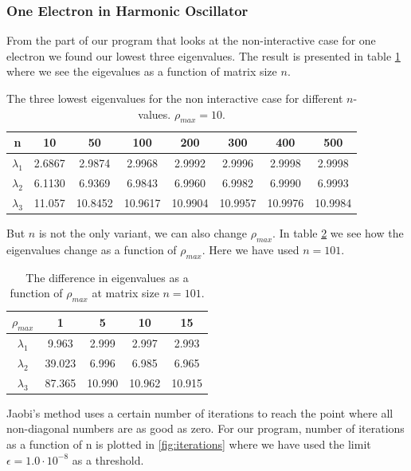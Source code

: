 \documentclass{article}
\begin{document}
\subsubsection{One Electron in Harmonic Oscillator}
From the part of our program that looks at the non-interactive case for one electron we found our lowest three eigenvalues. The result is presented in table \ref{tab:eigenvalues} where we see the eigevalues as a function of matrix size $n$.
\begin{table}[H]
\centering
\caption{The three lowest eigenvalues for the non interactive case for different $n$-values. $\rho_{max} = 10.$}
\begin{tabular}{c|c|c|c|c|c|c|c} 
n & 10 & 50 & 100 & 200 & 300 & 400 & 500 \\ \hline
$\lambda_1$ & 2.6867 & 2.9874  & 2.9968  & 2.9992  & 2.9996 & 2.9998  & 2.9998 \\ \hline
$\lambda_2$ & 6.1130 & 6.9369  & 6.9843  & 6.9960  & 6.9982 & 6.9990  & 6.9993\\ \hline
$\lambda_3$ & 11.057 & 10.8452 & 10.9617 & 10.9904 & 10.9957& 10.9976 & 10.9984\\ 
\end{tabular}
\label{tab:eigenvalues}
\end{table}
But $n$ is not the only variant, we can also change $\rho_{max}$. In table \ref{tab:rhoeigenvalues} we see how the eigenvalues change as a function of $\rho_{max}$. Here we have used $n = 101$.
\begin{table}[H]
\centering
\caption{The difference in eigenvalues as a function of $\rho_{max}$ at matrix size $n = 101$.}
\begin{tabular}{c|c|c|c|c}
$\rho_{max}$ & 1 & 5 & 10 & 15 \\ \hline
$\lambda_1$ &  9.963  & 2.999  & 2.997  & 2.993 \\ \hline
$\lambda_2$ &  39.023 & 6.996  & 6.985  & 6.965 \\ \hline
$\lambda_3$ &  87.365 & 10.990 & 10.962 & 10.915 \\ 
\end{tabular}
\label{tab:rhoeigenvalues}
\end{table}
Jaobi's method uses a certain number of iterations to reach the point where all non-diagonal numbers are as good as zero. For our program, number of iterations as a function of n is plotted in \ref{fig:iterations} where we have used the limit $\epsilon = 1.0\cdot 10^{-8}$ as a threshold.
\end{document}
